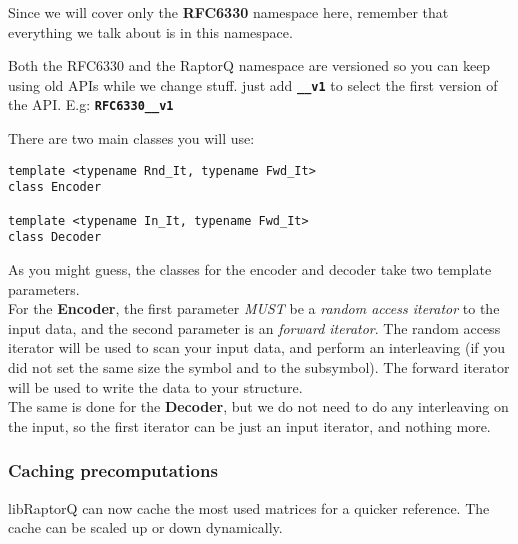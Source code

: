 \documentclass[11pt,a4paper]{refart}
\begin{document}
Since we will cover only the \textbf{RFC6330} namespace here, remember that everything we talk about is in this namespace.

Both the RFC6330 and the RaptorQ namespace are versioned so you can keep using old APIs while we change stuff. just add \textbf{\texttt{\_\_v1}} to select the first version of the API. E.g: \textbf{\texttt{RFC6330\_\_v1}}

\newpage

There are two main classes you will use:
\begin{verbatim}
template <typename Rnd_It, typename Fwd_It>
class Encoder

template <typename In_It, typename Fwd_It>
class Decoder
\end{verbatim}

As you might guess, the classes for the encoder and decoder take two template parameters.\\
For the \textbf{Encoder}, the first parameter \textit{MUST} be a \textit{random access iterator} to the input data, and the second parameter is an
\textit{forward iterator}. The random access iterator will be used to scan your input data, and perform an interleaving (if you did not set the same size the
symbol and to the subsymbol). The forward iterator will be used to write the data to your structure.\\
The same is done for the \textbf{Decoder}, but we do not need to do any interleaving on the input, so the first iterator can be just an input iterator,
and nothing more.

\subsubsection{Caching precomputations}
libRaptorQ can now cache the most used matrices for a quicker reference. The cache can be scaled up or down dynamically.
\end{document}
